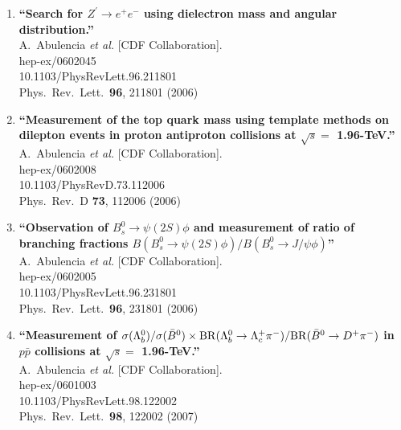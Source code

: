 \documentclass{article}
\begin{document}
\begin{enumerate}
\item%
{\bf ``Search for $Z^\prime \to e^+ e^-$ using dielectron mass and angular distribution.''}
  \\{}A.~Abulencia {\it et al.}  [CDF Collaboration].
  \\{}hep-ex/0602045
    \\{}10.1103/PhysRevLett.96.211801
\\{}Phys.\ Rev.\ Lett.\  {\bf 96}, 211801 (2006) %


\item%
{\bf ``Measurement of the top quark mass using template methods on dilepton events in proton antiproton collisions at $\sqrt{s} =$ 1.96-TeV.''}
  \\{}A.~Abulencia {\it et al.}  [CDF Collaboration].
  \\{}hep-ex/0602008
    \\{}10.1103/PhysRevD.73.112006
\\{}Phys.\ Rev.\ D {\bf 73}, 112006 (2006) %


\item%
{\bf ``Observation of $B_s^0 \to \psi(2S) \phi$ and measurement of ratio of branching fractions $B(B_s^0 \to \psi(2S) \phi)/B(B_s^0 \to J/\psi \phi)$''}
  \\{}A.~Abulencia {\it et al.}  [CDF Collaboration].
  \\{}hep-ex/0602005
    \\{}10.1103/PhysRevLett.96.231801
\\{}Phys.\ Rev.\ Lett.\  {\bf 96}, 231801 (2006) %


\item%
{\bf ``Measurement of $\sigma(\Lambda_b^0)/\sigma(\bar{B}^0) \times {\rm BR}(\Lambda_b^0 \to \Lambda_c^+ \pi^-)/{\rm BR}(\bar{B}^0 \to D^+ \pi^-)$ in $p\bar{p}$ collisions at $\sqrt{s} =$ 1.96-TeV.''}
  \\{}A.~Abulencia {\it et al.}  [CDF Collaboration].
  \\{}hep-ex/0601003
    \\{}10.1103/PhysRevLett.98.122002
\\{}Phys.\ Rev.\ Lett.\  {\bf 98}, 122002 (2007) %



\end{enumerate}
\end{document}
